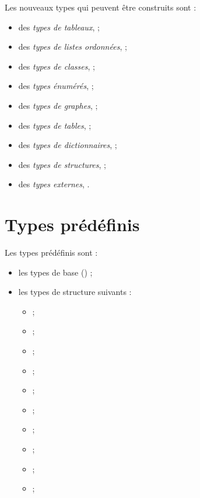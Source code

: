 
Les nouveaux types qui peuvent être construits sont :
\begin{itemize}
  \item des \emph{types de tableaux},  ;
  \item des \emph{types de listes ordonnées},  ;
  \item des \emph{types de classes},  ;
  \item des \emph{types énumérés},  ;
  \item des \emph{types de graphes},  ;
  \item des \emph{types de tables},  ;
  \item des \emph{types de dictionnaires},  ;
  \item des \emph{types de structures},  ;
  \item des \emph{types externes}, .
\end{itemize}









\section{Types prédéfinis}

Les types prédéfinis sont :
\begin{itemize}
  \item les types de base () ;
  \item les types de structure suivants :
  \begin{itemize}
    \item {} ;
    \item {} ;
    \item {} ;
    \item {} ;
    \item {} ;
    \item {} ;
    \item {} ;
    \item {} ;
    \item {} ;
    \item {} ;
  \end{itemize}
\end{itemize}








